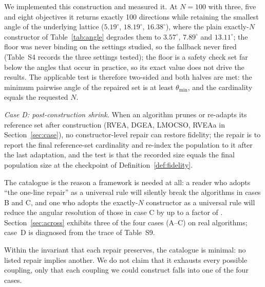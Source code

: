 \documentclass{SCIS2026}
\begin{document}
We implemented this construction and measured it. At $N=100$ with three, five and eight objectives it returns exactly 100 directions while retaining the smallest angle of the underlying lattice ($5.19^\circ$, $18.19^\circ$, $16.38^\circ$), where the plain exactly-$N$ constructor of Table~\ref{tab:angle} degrades them to $3.57^\circ$, $7.89^\circ$ and $13.11^\circ$; the floor was never binding on the settings studied, so the fallback never fired (Table~S4 records the three settings tested); the floor is a safety check set far below the angles that occur in practice, so its exact value does not drive the results. The applicable test is therefore two-sided and both halves are met: the minimum pairwise angle of the repaired set is at least $\theta_{\min}$, and the cardinality equals the requested $N$.

\emph{Case D: post-construction shrink.} When an algorithm prunes or re-adapts its reference set after construction (RVEA, DGEA, LMOCSO, RVEAa in Section~\ref{sec:case}), no constructor-level repair can restore fidelity; the repair is to report the final reference-set cardinality and re-index the population to it after the last adaptation, and the test is that the recorded size equals the final population size at the checkpoint of Definition~\ref{def:fidelity}.

The catalogue is the reason a framework is needed at all: a reader who adopts ``the one-line repair'' as a universal rule will silently break the algorithms in cases B and C, and one who adopts the exactly-$N$ constructor as a universal rule will reduce the angular resolution of those in case C by up to a factor of \angRatioFive{}. Section~\ref{sec:across} exhibits three of the four cases (A--C) on real algorithms; case~D is diagnosed from the trace of Table~S9.

\begin{table}[!t]
\centering
\footnotesize
\caption{Smallest pairwise angle between the directions of the reference set at a requested size $N$. The default constructor returns $L<N$ directions; the exactly-$N$ constructor returns $N$ but reduces the angular resolution}
\label{tab:angle}

\end{table}

Within the invariant that each repair preserves, the catalogue is minimal: no listed repair implies another. We do not claim that it exhausts every possible coupling, only that each coupling we could construct falls into one of the four cases.
\end{document}
